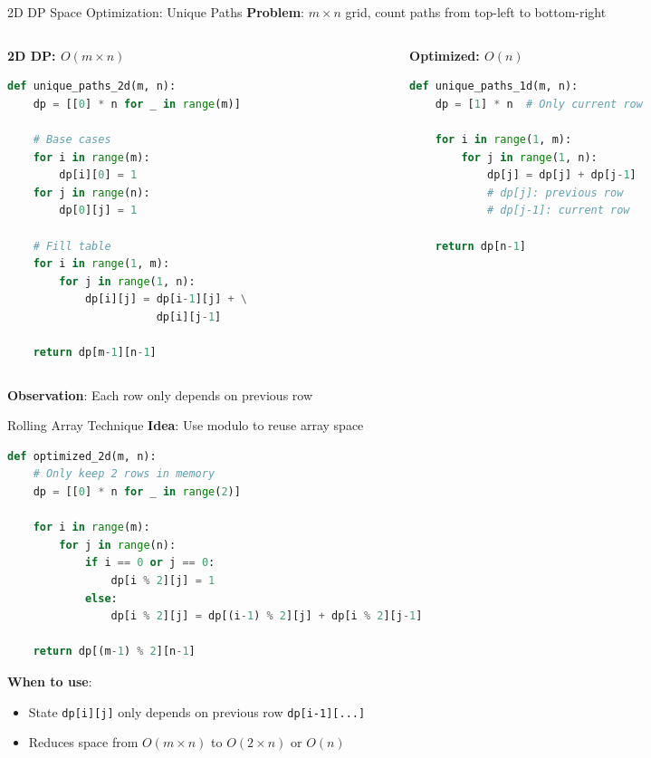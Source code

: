 \documentclass[aspectratio=169]{beamer}
\begin{document}
\begin{frame}[fragile]{2D DP Space Optimization: Unique Paths}
  \textbf{Problem}: $m \times n$ grid, count paths from top-left to bottom-right

\begin{columns}
\begin{column}{0.48\textwidth}
\textbf{2D DP: $O(m \times n)$}
\begin{lstlisting}[language=Python, basicstyle=\ttfamily\tiny]
def unique_paths_2d(m, n):
    dp = [[0] * n for _ in range(m)]

    # Base cases
    for i in range(m):
        dp[i][0] = 1
    for j in range(n):
        dp[0][j] = 1

    # Fill table
    for i in range(1, m):
        for j in range(1, n):
            dp[i][j] = dp[i-1][j] + \
                       dp[i][j-1]

    return dp[m-1][n-1]
\end{lstlisting}
\end{column}

\begin{column}{0.48\textwidth}
\textbf{Optimized: $O(n)$}
\begin{lstlisting}[language=Python, basicstyle=\ttfamily\tiny]
def unique_paths_1d(m, n):
    dp = [1] * n  # Only current row

    for i in range(1, m):
        for j in range(1, n):
            dp[j] = dp[j] + dp[j-1]
            # dp[j]: previous row
            # dp[j-1]: current row

    return dp[n-1]
\end{lstlisting}
\end{column}
\end{columns}

\vspace{0.3cm}

\textbf{Observation}: Each row only depends on previous row
\end{frame}

\begin{frame}[fragile]{Rolling Array Technique}
  \textbf{Idea}: Use modulo to reuse array space

\begin{lstlisting}[language=Python, basicstyle=\ttfamily\footnotesize]
def optimized_2d(m, n):
    # Only keep 2 rows in memory
    dp = [[0] * n for _ in range(2)]

    for i in range(m):
        for j in range(n):
            if i == 0 or j == 0:
                dp[i % 2][j] = 1
            else:
                dp[i % 2][j] = dp[(i-1) % 2][j] + dp[i % 2][j-1]

    return dp[(m-1) % 2][n-1]
\end{lstlisting}

  \textbf{When to use}:
  \begin{itemize}
    \item State \texttt{dp[i][j]} only depends on previous row \texttt{dp[i-1][...]}
    \item Reduces space from $O(m \times n)$ to $O(2 \times n)$ or $O(n)$
  \end{itemize}
\end{frame}
\end{document}
